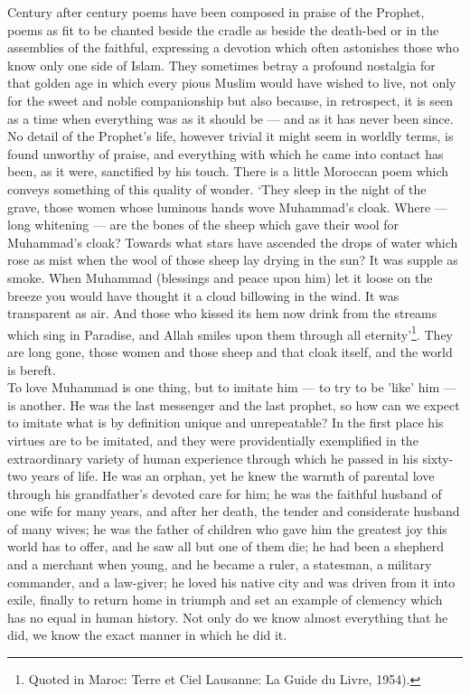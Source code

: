\documentclass[10pt, twoside,openright]{book}
\begin{document}
Century after century poems have been composed in praise of the Prophet, poems as fit to be chanted 
beside the cradle as beside the death\hyp{}bed or in the assemblies of the faithful, expressing a devotion 
which often astonishes those who know only one side of Islam. They sometimes betray a profound 
nostalgia for that golden age in which every pious Muslim would have wished to live, not only for the 
sweet and noble companionship but also because, in retrospect, it is seen as a time when everything 
was as it should be --- and as it has never been since. No detail of the Prophet's life, however 
trivial it might seem in worldly terms, is found unworthy of praise, and everything with which he 
came into contact has been, as it were, sanctified by his touch. There is a little Moroccan poem 
which conveys something of this quality of wonder. `They sleep in the night of the grave, those women 
whose luminous hands wove Muhammad's cloak. Where --- long whitening --- are the bones of the sheep which gave their wool for Muhammad's cloak? Towards what stars have ascended the drops of water which rose as mist when the wool of those sheep lay drying in the sun? It was supple as smoke. When Muhammad (blessings and peace upon him) let it loose on the breeze you would have thought it a cloud billowing in the wind. It was transparent as air. And those who kissed its hem now drink from the streams which sing in Paradise, and Allah smiles upon them through all eternity'\footnote{Quoted in Maroc: Terre et Ciel Lausanne: La Guide du Livre, 1954).}. They are long gone, those women and those sheep and that cloak itself, and the world is bereft. \\

To love Muhammad is one thing, but to imitate him --- to try to be 'like' him --- is another. He was the 
last messenger and the last prophet, so how can we expect to imitate what is by definition unique and 
unrepeatable? In the first place his virtues are to be imitated, and they were providentially 
exemplified in the extraordinary variety of human experience through which he passed in his sixty\hyp{}two 
years of life. He was an orphan, yet he knew the warmth of parental love through his grandfather's 
devoted care for him; he was the faithful husband of one wife for many years, and after her death, 
the tender and considerate husband of many wives; he was the father of children who gave him the 
greatest joy this world has to offer, and he saw all but one of them die; he had been a shepherd and 
a merchant when young, and he became a ruler, a statesman, a military commander, and a law\hyp{}giver; he 
loved his native city and was driven from it into exile, finally to return home in triumph and set an 
example of clemency which has no equal in human history. Not only do we know almost everything that 
he did, we know the exact manner in which he did it. \\
\end{document}
